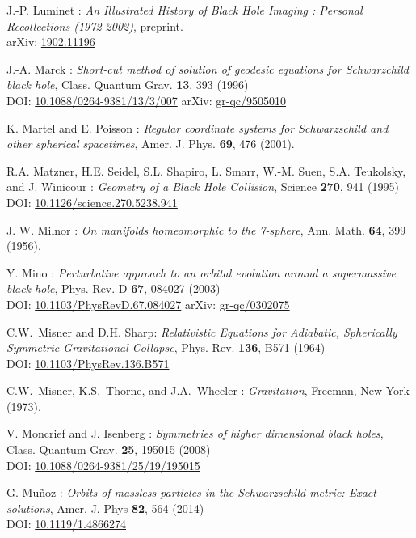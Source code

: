 \begin{thebibliography}{123}
J.-P. Luminet :
{\em An Illustrated History of Black Hole Imaging : Personal Recollections (1972-2002)}, preprint.\\
arXiv: \href{https://arxiv.org/abs/1902.11196}{1902.11196}

J.-A. Marck :
{\em Short-cut method of solution of geodesic equations for Schwarzchild black hole},
Class. Quantum Grav. {\bf 13}, 393 (1996)\\
DOI: \href{https://doi.org/10.1088/0264-9381/13/3/007}{10.1088/0264-9381/13/3/007}\hfill
arXiv: \href{https://arxiv.org/abs/gr-qc/9505010}{gr-qc/9505010}

K. Martel and E. Poisson :
\emph{Regular coordinate systems for Schwarzschild and other spherical spacetimes},
Amer. J. Phys. {\bf 69}, 476 (2001).

R.A. Matzner, H.E. Seidel, S.L. Shapiro, L. Smarr, W.-M. Suen, S.A. Teukolsky, and
J. Winicour : {\em Geometry of a Black Hole Collision},
Science {\bf 270}, 941 (1995)\\
DOI: \href{https://doi.org/10.1126/science.270.5238.941}{10.1126/science.270.5238.941}

J. W. Milnor : {\em On manifolds homeomorphic to the 7-sphere},
Ann. Math. {\bf 64}, 399 (1956).

Y. Mino :
{\em Perturbative approach to an orbital evolution around a supermassive black hole},
Phys. Rev. D {\bf 67}, 084027 (2003)\\
DOI: \href{https://doi.org/10.1103/PhysRevD.67.084027}{10.1103/PhysRevD.67.084027}\hfill
arXiv: \href{https://arxiv.org/abs/gr-qc/0302075}{gr-qc/0302075}

C.W.~Misner and D.H. Sharp:
{\em Relativistic Equations for Adiabatic, Spherically Symmetric Gravitational Collapse},
Phys. Rev. {\bf 136}, B571 (1964)\\
DOI: \href{https://doi.org/10.1103/PhysRev.136.B571}{10.1103/PhysRev.136.B571}

C.W.~Misner, K.S.~Thorne, and J.A.~Wheeler : {\em Gravitation},
Freeman, New York (1973).

V. Moncrief and J. Isenberg :
{\em Symmetries of higher dimensional black holes},
Class. Quantum Grav. {\bf 25}, 195015 (2008)\\
DOI: \href{https://doi.org/10.1088/0264-9381/25/19/195015}{10.1088/0264-9381/25/19/195015}

G. Mu\~noz :
{\em Orbits of massless particles in the Schwarzschild metric: Exact solutions},
Amer. J. Phys {\bf 82}, 564 (2014)\\
DOI: \href{https://doi.org/10.1119/1.4866274}{10.1119/1.4866274}


\end{thebibliography}
